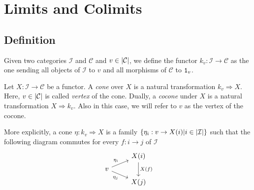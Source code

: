 
\chapter{Limits and Colimits}

\section{Definition}

Given two categories \(\mathcal{I}\) and \(\mathcal{C}\) and
\(v \in \left\lvert\mathcal{C}\right\rvert\), we define the functor
\(k_v : \mathcal{I} \to \mathcal{C}\) as the one sending all objects of
\(\mathcal{I}\) to \(v\) and all morphisms of \(\mathcal{C}\) to \(\mathtt 1_v\).

\begin{definition}
  Let \(X : \mathcal{I} \to \mathcal{C}\) be a functor. A {\em cone} over
  \(X\) is a natural transformation \(k_v \Rightarrow X\). Here,
  \(v \in \left\lvert\mathcal{C}\right\rvert\) is called {\em vertex} of the cone. Dually, a {\em
    cocone} under \(X\) is a natural transformation
  \(X \Rightarrow k_v\). Also in this case, we will refer to \(v\) as the vertex
  of the cocone.
\end{definition}

More explicitly, a cone \(\eta : k_v \Rightarrow X\) is a family
\(\left\{ \eta_i : v \to X(i) | i \in \left\lvert\mathcal{I}\right\rvert \right\}\) such that the following diagram
commutes for every \(f : i \to j\) of \(\mathcal{I}\)
\[
  \begin{tikzcd}[row sep=tiny]
    & X(i) \ar["{X(f)}", dd] \\
    v \ar["{\eta_i}", ur] \ar["{\eta_j}", dr, swap] \\
    & X(j)
  \end{tikzcd}
\]

